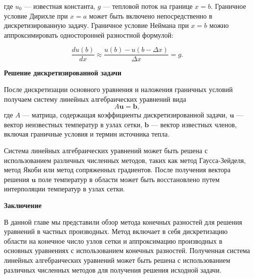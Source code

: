 где $u_0$ — известная константа,
$g$ — тепловой поток на границе $x = b$.
Граничное условие Дирихле при $x = a$ может быть
включено непосредственно в дискретизированную задачу.
Граничное условие Неймана при $x = b$ можно аппроксимировать
односторонней разностной формулой:

\begin{equation*}
    \frac{du(b)}{dx} \approx \frac{u(b) - u(b - \Delta x)}{\Delta x} = g.
\end{equation*}

\textbf{Решение дискретизированной задачи}

После дискретизации основного уравнения и наложения граничных
условий получаем систему линейных алгебраических уравнений вида
\begin{equation*}
    A\mathbf{u} = \mathbf{b},
\end{equation*}
где $A$ — матрица, содержащая коэффициенты дискретизированной
задачи, $\mathbf{u}$ — вектор неизвестных температур в узлах сетки,
$\mathbf{b}$ — вектор известных членов, включая граничные
условия и термин источника тепла.

Система линейных алгебраических уравнений может быть решена с
использованием различных численных методов, таких как метод
Гаусса-Зейделя, метод Якоби или метод сопряженных градиентов.
После получения вектора решения $\mathbf{u}$ поле температур в
области может быть восстановлено путем интерполяции температур в узлах сетки.

\textbf{Заключение}

В данной главе мы представили обзор метода конечных разностей
для решения уравнений в частных производных.
Метод включает в себя дискретизацию области на конечное число
узлов сетки и аппроксимацию производных в основных уравнениях
с использованием конечных разностей.
Полученная система линейных
алгебраических уравнений может быть решена с использованием различных
численных методов для получения решения исходной задачи.
